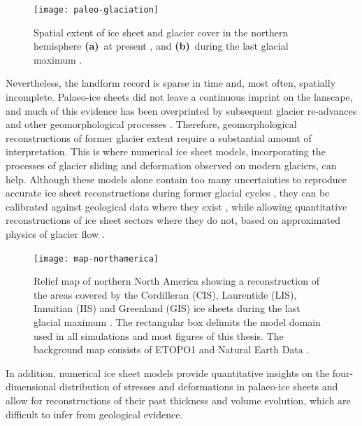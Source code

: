 \documentclass[a4paper]{kappa}
\newcommand{\chem}[1]{\ensuremath{\mathrm{#1}}}
\begin{document}
\begin{figure}
  \texttt{[image: paleo-glaciation]}
  \caption{Spatial extent of ice sheet and glacier cover in the northern
           hemisphere \textbf{(a)}~at present \citep{Patterson.Kelso.2014}, and
           \textbf{(b)}~during the last glacial maximum
           \citep{Ehlers.Gibbard.2007}.}
  \label{fig:paleo-glaciation}
\end{figure}

Nevertheless, the landform record is sparse in time and, most often, spatially
incomplete. Palaeo-ice sheets did not leave a continuous imprint on the
lanscape, and much of this evidence has been overprinted by subsequent glacier
re-advances and other geomorphological processes \citep{Kleman.1994,
Kleman.etal.2006, Kleman.etal.2010}.
Therefore, geomorphological reconstructions of former glacier extent require a
substantial amount of interpretation. This is where numerical ice sheet models,
incorporating the processes of glacier sliding \citep[e.g.,][]{Weertman.1957}
and deformation \citep[e.g.,][]{Nye.1953} observed on modern glaciers, can
help. Although these models alone contain too many uncertainties to reproduce
accurate ice sheet reconstructions during former glacial cycles
\citep[e.g.,][]{Hebeler.etal.2008}, they can be calibrated against geological
data where they exist \citep{Napieralski.etal.2007}, while allowing
quantitative reconstructions of ice sheet sectors where they do not, based on
approximated physics of glacier flow \citep[e.g.,][]{Marshall.etal.2002,
Tarasov.Peltier.2004}.

\begin{figure}
  \texttt{[image: map-northamerica]}
  \caption{Relief map of northern North America showing a reconstruction of the
           areas covered by the Cordilleran (CIS), Laurentide (LIS), Innuitian
           (IIS) and Greenland (GIS) ice sheets during the last glacial maximum
           \citep[21.4 to 16.8\,cal\,\chem{^{14}C}\,kyr\,BP,][]{Dyke.2004}.
           The rectangular box delimits the model domain used in all
           simulations and most figures of this thesis. The background
           map consists of ETOPO1 \citep{Amante.Eakins.2009} and Natural Earth
           Data \citep{Patterson.Kelso.2014}.}
  \label{fig:map-northamerica}
\end{figure}

In addition, numerical ice sheet models provide quantitative insights on the
four-dimensional distribution of stresses and deformations in palaeo-ice sheets
and allow for reconstructions of their past thickness and volume evolution, which
are difficult to infer from geological evidence.
\end{document}
